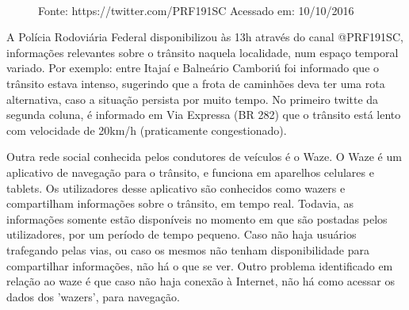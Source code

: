 \begin{figure}[htbp!]
	\quad \quad \quad \quad
	\\
	\centering \tiny Fonte: https://twitter.com/PRF191SC Acessado em: 10/10/2016
\end{figure}

A Polícia Rodoviária Federal disponibilizou às 13h através do canal @PRF191SC, informações relevantes sobre o trânsito naquela localidade, 
num espaço temporal variado. Por exemplo: entre Itajaí e Balneário Camboriú foi informado que o trânsito estava intenso, sugerindo que a frota de caminhões deva ter uma rota alternativa, caso a situação persista por muito tempo. No primeiro twitte da segunda coluna, é informado em Via Expressa (BR 282) que o trânsito está lento com velocidade de 20km/h (praticamente congestionado). 


Outra rede social conhecida pelos condutores de veículos é o Waze. O Waze é um aplicativo de navegação para o trânsito, e funciona em aparelhos celulares e tablets. Os utilizadores desse aplicativo são conhecidos como wazers e compartilham informações sobre o trânsito, em tempo real. Todavia, as informações somente estão disponíveis no momento em que são postadas pelos utilizadores, por um período de tempo pequeno. Caso não haja usuários trafegando pelas vias, ou caso os mesmos não tenham disponibilidade para compartilhar informações, não há o que se ver. Outro problema identificado em relação ao waze é que caso não haja conexão à Internet, não há como acessar os dados dos 'wazers', para navegação.

